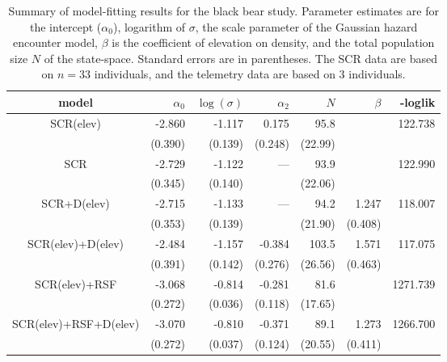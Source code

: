 \begin{table}
\centering
\caption{
Summary of model-fitting results for the black bear study. Parameter
estimates are for the intercept ($\alpha_{0}$), logarithm of $\sigma$,
the
scale parameter of the Gaussian hazard encounter model, 
 $\beta$ is the coefficient of elevation on density, and the total
 population size $N$ of the state-space. Standard errors
 are in parentheses.
The SCR data are based on $n=33$ individuals, and the telemetry data
are based on 3 individuals. 
}
\begin{tabular}{c|rrrrrr}
\hline \hline
model         & $\alpha_0$ & $\log(\sigma)$ & $\alpha_{2}$ & $N$ & 
$\beta$       & -loglik                                                                         \\ \hline
SCR(elev)      & -2.860    & -1.117        & 0.175       & 95.8        &        & 122.738  \\
             &  (0.390)     & (0.139)       & (0.248)       & (22.99)        &        &           \\
SCR          & -2.729    & -1.122        & ---          & 93.9        &        & 122.990  \\
              & (0.345)     & (0.140)       &              & (22.06)        &        &           \\
SCR+D(elev)      & -2.715    & -1.133        & ---          & 94.2        & 1.247 & 118.007  \\
              & (0.353)     & (0.139)       &              & (21.90)    & (0.408) &           \\
SCR(elev)+D(elev) & -2.484    & -1.157        & -0.384      & 103.5        & 1.571 & 117.075  \\
              & (0.391)     & (0.142)       & (0.276)       & (26.56)   & (0.463) &           \\
SCR(elev)+RSF       & -3.068    & -0.814        & -0.281      & 81.6        &        & 1271.739 \\
              & (0.272)    & (0.036)         & (0.118)       & (17.65)        &        &           \\
SCR(elev)+RSF+D(elev)  & -3.070    & -0.810        & -0.371      & 89.1        & 1.273 & 1266.700 \\
              & (0.272)    & (0.037)         & (0.124)       & (20.55)        & (0.411) &           \\
\hline
\end{tabular}
\label{tab.nyresults}
\end{table}



